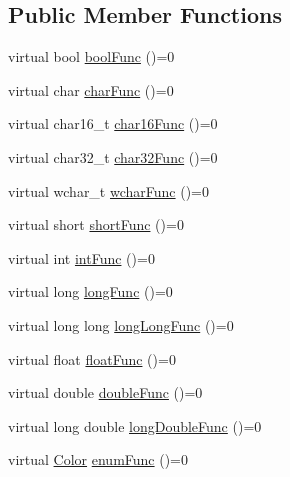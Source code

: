 \subsection*{Public Member Functions}
\begin{DoxyCompactItemize}
\item 
virtual bool \mbox{\hyperlink{structDefaultBehavioreTests_1_1ScalarFunctions_addb29942de86693d6246dc8713e2c489}{bool\+Func}} ()=0
\item 
virtual char \mbox{\hyperlink{structDefaultBehavioreTests_1_1ScalarFunctions_afd7de7c12b6216711d65ddd74a656f4f}{char\+Func}} ()=0
\item 
virtual char16\+\_\+t \mbox{\hyperlink{structDefaultBehavioreTests_1_1ScalarFunctions_ae5fe6d687487df6efadfa2d6d2bdae16}{char16\+Func}} ()=0
\item 
virtual char32\+\_\+t \mbox{\hyperlink{structDefaultBehavioreTests_1_1ScalarFunctions_a74732b2bf0872f5f557ffbe80595a677}{char32\+Func}} ()=0
\item 
virtual wchar\+\_\+t \mbox{\hyperlink{structDefaultBehavioreTests_1_1ScalarFunctions_aacf612d4b5ef544df8071d0246fffc5d}{wchar\+Func}} ()=0
\item 
virtual short \mbox{\hyperlink{structDefaultBehavioreTests_1_1ScalarFunctions_a5a99abb014e11bb87e2619a554a7baf4}{short\+Func}} ()=0
\item 
virtual int \mbox{\hyperlink{structDefaultBehavioreTests_1_1ScalarFunctions_a15af42fed7842f663ecd3552430eae9a}{int\+Func}} ()=0
\item 
virtual long \mbox{\hyperlink{structDefaultBehavioreTests_1_1ScalarFunctions_a1c6935a6c7c3799f0f7b439782872de7}{long\+Func}} ()=0
\item 
virtual long long \mbox{\hyperlink{structDefaultBehavioreTests_1_1ScalarFunctions_aa2e9874b64f0d9b586f4da9f423ee1fa}{long\+Long\+Func}} ()=0
\item 
virtual float \mbox{\hyperlink{structDefaultBehavioreTests_1_1ScalarFunctions_a55882bf5472279f8d684bca736536e27}{float\+Func}} ()=0
\item 
virtual double \mbox{\hyperlink{structDefaultBehavioreTests_1_1ScalarFunctions_aa22190dad59d116d7f9749157675464e}{double\+Func}} ()=0
\item 
virtual long double \mbox{\hyperlink{structDefaultBehavioreTests_1_1ScalarFunctions_a7e1033591a21c1bca0ffe62b1e831145}{long\+Double\+Func}} ()=0
\item 
virtual \mbox{\hyperlink{structDefaultBehavioreTests_a0125c0fb6d312ce842f4106491751506}{Color}} \mbox{\hyperlink{structDefaultBehavioreTests_1_1ScalarFunctions_a8836d8cc922b2e65d72cd4cbfb9a3f2e}{enum\+Func}} ()=0

\end{DoxyCompactItemize}
